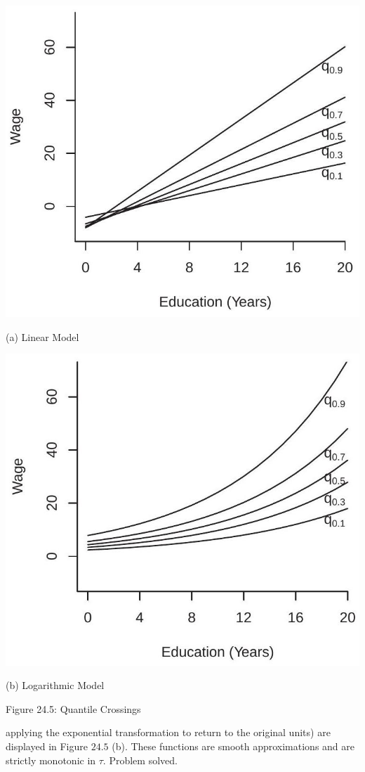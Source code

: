 \documentclass[10pt]{article}
\begin{document}
\includegraphics[max width=\textwidth]{2022_10_23_47027c652ef567187a65g-14}

(a) Linear Model

\includegraphics[max width=\textwidth]{2022_10_23_47027c652ef567187a65g-14(1)}

(b) Logarithmic Model

Figure 24.5: Quantile Crossings

applying the exponential transformation to return to the original units) are displayed in Figure $24.5$ (b). These functions are smooth approximations and are strictly monotonic in $\tau$. Problem solved.
\end{document}
